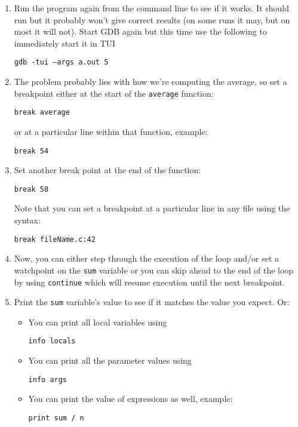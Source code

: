 \documentclass[12pt]{scrartcl}
\begin{document}
\begin{enumerate}
  \item Run the program again from the command line to see if it works.
  It should run but it probably won't give correct results (on some runs it
  may, but on most it will not).  Start GDB again
  but this time use the following to immediately start it in TUI
  
  \texttt{gdb -tui --args a.out 5}
  
  \item The problem probably lies with how we're computing the average, so 
  set a breakpoint either at the start of the \texttt{average} function:
  
  \texttt{break average}
  
  or at a particular line within that function, example:
  
  \texttt{break 54}
  
  \item Set another break point at the end of the function:

  \texttt{break 58}
  
  Note that you can set a breakpoint at a particular line in any 
  file using the syntax:

  \texttt{break fileName.c:42}
  
  \item Now, you can either step through the execution of the loop 
  and/or set a watchpoint on the \texttt{sum} variable or you 
  can skip ahead to the end of the loop by using \texttt{continue}
  which will resume execution until the next breakpoint.
  
  \item Print the \texttt{sum} variable's value to see if it 
  matches the value you expect.  Or:
  
  \begin{itemize}
    \item You can print all local variables using
    
    \texttt{info locals}
  
     \item You can print all the parameter values using
     
     \texttt{info args}

	 \item You can print the value of expressions as well, example:
	 
	 \texttt{print sum / n}
	 

\end{itemize}
\end{enumerate}
\end{document}
